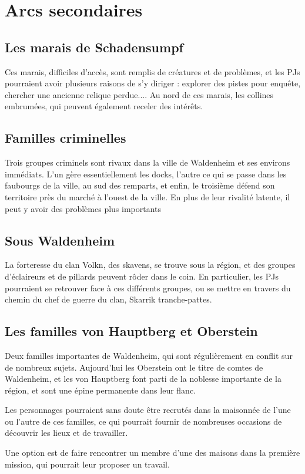 \documentclass[10pt,a4paper]{book}
\begin{document}
\section{Arcs secondaires}
\subsection{Les marais de Schadensumpf}
Ces marais, difficiles d'accès, sont remplis de créatures et de problèmes, et les PJs pourraient avoir plusieurs raisons de s'y diriger : explorer des pistes pour enquête, chercher une ancienne relique perdue.... Au nord de ces marais, les collines embrumées, qui peuvent également receler des intérêts.
\subsection{Familles criminelles}
Trois groupes criminels sont rivaux dans la ville de Waldenheim et ses environs immédiats. L'un gère essentiellement les docks, l'autre ce qui se passe dans les faubourgs de la ville, au sud des remparts, et enfin, le troisième défend son territoire près du marché à l'ouest de la ville. En plus de leur rivalité latente, il peut y avoir des problèmes plus importants
\subsection{Sous Waldenheim}
La forteresse du clan Volkn, des skavens, se trouve sous la région, et des groupes d'éclaireurs et de pillards peuvent rôder dans le coin. En particulier, les PJs pourraient se retrouver face à ces différents groupes, ou se mettre en travers du chemin du chef de guerre du clan, Skarrik tranche-pattes.
\subsection{Les familles von Hauptberg et Oberstein}

Deux familles importantes de Waldenheim, qui sont régulièrement en conflit sur de nombreux sujets. Aujourd'hui les Oberstein ont le titre de comtes de Waldenheim, et les von Hauptberg font parti de la noblesse importante de la région, et sont une épine permanente dans leur flanc.

Les personnages pourraient sans doute être recrutés dans la maisonnée de l'une ou l'autre de ces familles, ce qui pourrait fournir de nombreuses occasions de découvrir les lieux et de travailler.

Une option est de faire rencontrer un membre d'une des maisons dans la première mission, qui pourrait leur proposer un travail.
\end{document}

